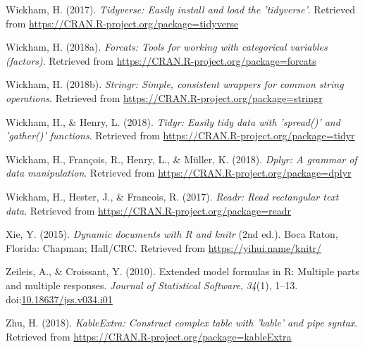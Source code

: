\documentclass[man, noextraspace]{apa6}
\theoremstyle{definition}
\theoremstyle{definition}
\theoremstyle{definition}
\theoremstyle{remark}
\begin{document}
\hypertarget{ref-R-tidyverse}{}
Wickham, H. (2017). \emph{Tidyverse: Easily install and load the
'tidyverse'}. Retrieved from
\url{https://CRAN.R-project.org/package=tidyverse}

\hypertarget{ref-R-forcats}{}
Wickham, H. (2018a). \emph{Forcats: Tools for working with categorical
variables (factors)}. Retrieved from
\url{https://CRAN.R-project.org/package=forcats}

\hypertarget{ref-R-stringr}{}
Wickham, H. (2018b). \emph{Stringr: Simple, consistent wrappers for
common string operations}. Retrieved from
\url{https://CRAN.R-project.org/package=stringr}

\hypertarget{ref-R-tidyr}{}
Wickham, H., \& Henry, L. (2018). \emph{Tidyr: Easily tidy data with
'spread()' and 'gather()' functions}. Retrieved from
\url{https://CRAN.R-project.org/package=tidyr}

\hypertarget{ref-R-dplyr}{}
Wickham, H., François, R., Henry, L., \& Müller, K. (2018). \emph{Dplyr:
A grammar of data manipulation}. Retrieved from
\url{https://CRAN.R-project.org/package=dplyr}

\hypertarget{ref-R-readr}{}
Wickham, H., Hester, J., \& Francois, R. (2017). \emph{Readr: Read
rectangular text data}. Retrieved from
\url{https://CRAN.R-project.org/package=readr}

\hypertarget{ref-R-knitr}{}
Xie, Y. (2015). \emph{Dynamic documents with R and knitr} (2nd ed.).
Boca Raton, Florida: Chapman; Hall/CRC. Retrieved from
\url{https://yihui.name/knitr/}

\hypertarget{ref-R-Formula}{}
Zeileis, A., \& Croissant, Y. (2010). Extended model formulas in R:
Multiple parts and multiple responses. \emph{Journal of Statistical
Software}, \emph{34}(1), 1--13.
doi:\href{https://doi.org/10.18637/jss.v034.i01}{10.18637/jss.v034.i01}

\hypertarget{ref-R-kableExtra}{}
Zhu, H. (2018). \emph{KableExtra: Construct complex table with 'kable'
and pipe syntax}. Retrieved from
\url{https://CRAN.R-project.org/package=kableExtra}

\endgroup
\end{document}
